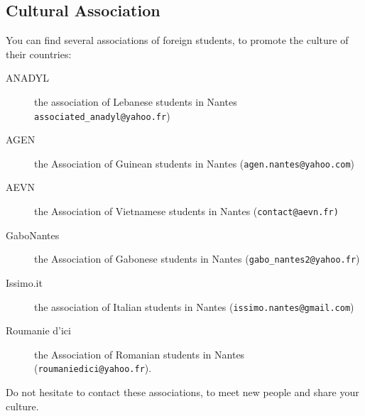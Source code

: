 
\subsection{Cultural Association}
You can find several associations of foreign students, to promote the culture of their countries:
\begin{description}
    \item[ANADYL] the association of Lebanese students in Nantes \texttt{associated\_anadyl@yahoo.fr})
    \item[AGEN] the Association of Guinean students in Nantes (\texttt{agen.nantes@yahoo.com})
    \item[AEVN]  the Association of Vietnamese students in Nantes (\texttt{contact@aevn.fr)}
    \item[GaboNantes] the Association of Gabonese students in Nantes (\texttt{gabo\_nantes2@yahoo.fr})
    \item[Issimo.it] the association of Italian students in Nantes (\texttt{issimo.nantes@gmail.com})
    \item[Roumanie d'ici] the Association of Romanian students in Nantes (\texttt{roumaniedici@yahoo.fr}).
\end{description}
Do not hesitate to contact these associations, to meet new people and share your culture.

